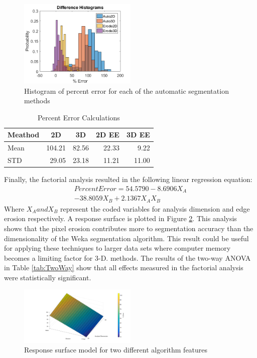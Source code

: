 \documentclass[11pt, twocolumn]{article}
\begin{document}
\begin{figure}[H]
	\centering
	\includegraphics[width=0.5\textwidth]{DifferenceHistograms.png}
	\caption{Histogram of percent error for each of the automatic segmentation methods}
	\label{fig:DiffHist}
\end{figure}
\begin{table}[htbp]
	\centering
	\caption{Percent Error Calculations}
	\begin{tabular}{|l|r|r|r|r|}
		\toprule
		Meathod & \multicolumn{1}{c|}{2D} & \multicolumn{1}{c|}{3D} & \multicolumn{1}{c|}{2D EE} & \multicolumn{1}{c|}{3D EE} \\
		\midrule
		Mean  & 104.21 & 82.56 & 22.33 & 9.22 \\
		\midrule
		STD   & 29.05 & 23.18 & 11.21 & 11.00 \\
		\bottomrule
	\end{tabular}%
	\label{tab:DiffTable}%
\end{table}%

Finally, the factorial analysis resulted in the following linear regression equation:
\begin{multline}
Percent Error= 54.5790 - 8.6906 X_A \\
- 38.8059 X_B + 2.1367 X_A X_B
\end{multline}
Where $X_A and X_B$ represent the coded variables for analysis dimension and edge erosion respectively. A response surface is plotted in Figure \ref{fig:Surf}. This analysis shows that the pixel erosion contributes more to segmentation accuracy than the dimensionality of the Weka segmentation algorithm. This result could be useful for applying these techniques to larger data sets where computer memory becomes a limiting factor for 3-D.  methods. The results of the two-way ANOVA in Table \ref{tab:TwoWay} show that all effects measured in the factorial analysis were statistically significant. 

\begin{figure}[H]
	\centering
	\includegraphics[width=0.5\textwidth]{ResponseSurface.png}
	\caption{Response surface model for two different algorithm features}
	\label{fig:Surf}
\end{figure}
\end{document}
